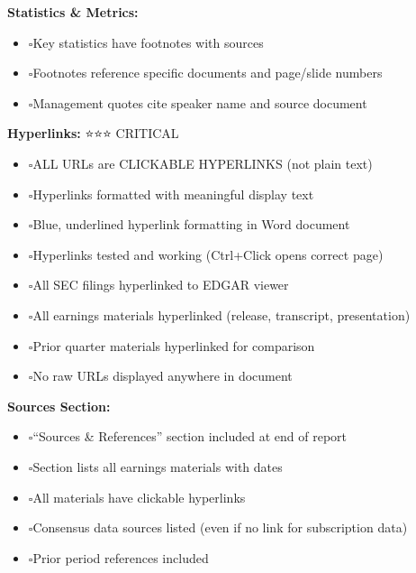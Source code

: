 \documentclass[11pt]{article}
\newcommand{\UncheckedBox}{$\square$}
\begin{document}
\textbf{Statistics \& Metrics:}

\begin{itemize}[leftmargin=*,itemsep=2pt,topsep=2pt]
\item {} \UncheckedBox Key statistics have footnotes with sources
\item {} \UncheckedBox Footnotes reference specific documents and page/slide numbers
\item {} \UncheckedBox Management quotes cite speaker name and source document
\end{itemize}

\textbf{Hyperlinks:} ⭐⭐⭐ CRITICAL

\begin{itemize}[leftmargin=*,itemsep=2pt,topsep=2pt]
\item {} \UncheckedBox ALL URLs are CLICKABLE HYPERLINKS (not plain text)
\item {} \UncheckedBox Hyperlinks formatted with meaningful display text
\item {} \UncheckedBox Blue, underlined hyperlink formatting in Word document
\item {} \UncheckedBox Hyperlinks tested and working (Ctrl+Click opens correct page)
\item {} \UncheckedBox All SEC filings hyperlinked to EDGAR viewer
\item {} \UncheckedBox All earnings materials hyperlinked (release, transcript, presentation)
\item {} \UncheckedBox Prior quarter materials hyperlinked for comparison
\item {} \UncheckedBox No raw URLs displayed anywhere in document
\end{itemize}

\textbf{Sources Section:}

\begin{itemize}[leftmargin=*,itemsep=2pt,topsep=2pt]
\item {} \UncheckedBox ``Sources \& References'' section included at end of report
\item {} \UncheckedBox Section lists all earnings materials with dates
\item {} \UncheckedBox All materials have clickable hyperlinks
\item {} \UncheckedBox Consensus data sources listed (even if no link for subscription data)
\item {} \UncheckedBox Prior period references included
\end{itemize}
\end{document}
